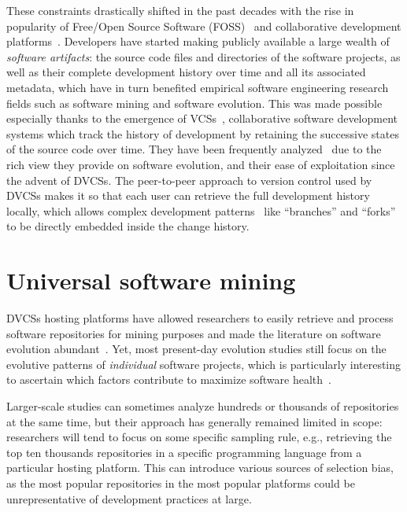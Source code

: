 These constraints drastically shifted in the past decades with the rise in
popularity of Free/Open Source Software
(FOSS)~\cite{syeed-2013-oss-evol-review} and collaborative development
platforms~\cite{kalliamvakou2014promises}. Developers have started making
publicly available a large wealth of \emph{software artifacts}: the source code
files and directories of the software projects, as well as their complete
development history over time and all its associated metadata, which have in
turn benefited empirical software engineering research fields such as software
mining and software evolution. This was made possible especially thanks to the
emergence of \glspl{VCS}~\cite{spinellis2005vcs}, collaborative software
development systems which track the history of development by retaining the
successive states of the source code over time. They have been frequently
analyzed~\cite{kagdi2007msrsurvey} due to the rich view they provide on
software evolution, and their ease of exploitation since the advent of
\glspl{DVCS}. The peer-to-peer approach to version control used by \glspl{DVCS}
makes it so that each user can retrieve the full development history locally,
which allows complex development
patterns~\cite{gousios2014pullrequests,gousios2015work} like ``branches'' and
``forks'' to be directly embedded inside the change history.

\section{Universal software mining}

\glspl{DVCS} hosting platforms have allowed researchers to easily retrieve and
process software repositories for mining purposes and made the literature on
software evolution abundant~\cite{herraiz2013evolution}. Yet, most present-day
evolution studies still focus on the evolutive patterns of \emph{individual}
software projects, which is particularly interesting to ascertain which factors
contribute to maximize software health~\cite{DBLP:conf/icse/2018soheal}.

Larger-scale studies can sometimes analyze hundreds or thousands of
repositories at the same time, but their approach has generally remained
limited in scope: researchers will tend to focus on some specific sampling
rule, e.g., retrieving the top ten thousands repositories in a specific
programming language from a particular hosting platform. This can introduce
various sources of selection bias, as the most popular repositories in the most
popular platforms could be unrepresentative of development practices at large.

